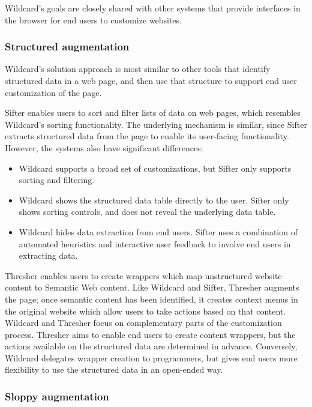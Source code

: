\documentclass[english,submission]{programming}
\providecommand{\tightlist}{%
  \setlength{\itemsep}{0pt}\setlength{\parskip}{0pt}}
\begin{document}
Wildcard's goals are closely shared with other systems that provide
interfaces in the browser for end users to customize websites.

\hypertarget{structured-augmentation}{%
\subsubsection{Structured augmentation}\label{structured-augmentation}}

Wildcard's solution approach is most similar to other tools that
identify structured data in a web page, and then use that structure to
support end user customization of the page.

Sifter \autocite{huynh2006} enables users to sort and filter lists of
data on web pages, which resembles Wildcard's sorting functionality. The
underlying mechanism is similar, since Sifter extracts structured data
from the page to enable its user-facing functionality. However, the
systems also have significant differences:

\begin{itemize}
\tightlist
\item
  Wildcard supports a broad set of customizations, but Sifter only
  supports sorting and filtering.
\item
  Wildcard shows the structured data table directly to the user. Sifter
  only shows sorting controls, and does not reveal the underlying data
  table.
\item
  Wildcard hides data extraction from end users. Sifter uses a
  combination of automated heuristics and interactive user feedback to
  involve end users in extracting data.
\end{itemize}

Thresher \autocite{hogue2005} enables users to create wrappers which map
unstructured website content to Semantic Web content. Like Wildcard and
Sifter, Thresher augments the page; once semantic content has been
identified, it creates context menus in the original website which allow
users to take actions based on that content. Wildcard and Thresher focus
on complementary parts of the customization process. Thresher aims to
enable end users to create content wrappers, but the actions available
on the structured data are determined in advance. Conversely, Wildcard
delegates wrapper creation to programmers, but gives end users more
flexibility to use the structured data in an open-ended way.

\hypertarget{sloppy-augmentation}{%
\subsubsection{Sloppy augmentation}\label{sloppy-augmentation}}
\end{document}
